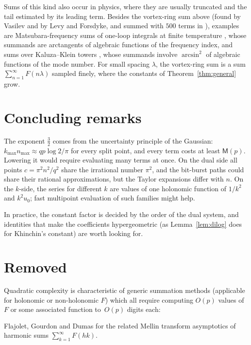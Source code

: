 \documentclass[11pt,reqno]{amsart}
\theoremstyle{definition}
\theoremstyle{remark}
\newcommand{\Mul}{\mathsf{M}}
\begin{document}
Sums of this kind also occur in physics, where they are usually truncated and the tail estimated by its leading
term. Besides the vortex-ring sum above (found by Vasilev and by Levy and Forsdyke, and summed with $500$ terms in
\cite{MS22}), examples are Matsubara-frequency sums of one-loop integrals at finite temperature \cite{HLS24}, whose
summands are arctangents of algebraic functions of the frequency index, and sums over Kaluza--Klein towers
\cite{Pet02}, whose summands involve $\arcsin^2$ of algebraic functions of the mode number. For small spacing $\lambda$,
the vortex-ring sum is a sum $\sum_{n=1}^{\infty} F(n\lambda)$ sampled finely, where the constants of Theorem~\ref{thm:general} grow.

\section{Concluding remarks}\label{sec:concl}

The exponent $\frac32$ comes from the uncertainty principle of the Gaussian: $k_{\max}n_{\max} \approx qp\log2/\pi$ for
every split point, and every term costs at least $\Mul(p)$. Lowering it would require evaluating many terms at once.
On the dual side all points $c = \pi^2n^2/q^2$ share the irrational number $\pi^2$, and the bit-burst paths could share
their rational approximations, but the Taylor expansions differ with $n$. On the $k$-side, the series for different $k$
are values of one holonomic function of $1/k^2$ and $k^2u_0$; fast multipoint evaluation of such families might help.

In practice, the constant factor is decided by the order of the dual system, and identities that make the
coefficients hypergeometric (as Lemma~\ref{lem:dilog} does for Khinchin's constant) are worth looking for.

\section{Removed}

Quadratic complexity is characteristic of generic
summation methods (applicable for holonomic or non-holonomic $F$)
which all require computing $O(p)$ values of $F$ or
some associated function to~$O(p)$ digits each:



Flajolet, Gourdon and Dumas \cite{FGD95} for the related Mellin transform asymptotics of harmonic sums
$\sum_{k=1}^{\infty} F(hk)$.
\end{document}
